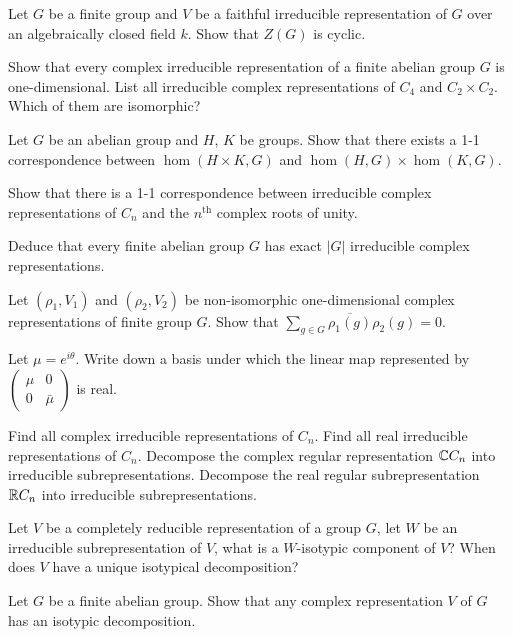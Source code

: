 \begin{question}{15}
	Let $G$ be a finite group and $V$ be a faithful irreducible representation of $G$ over an algebraically closed field $k$. Show that $Z(G)$ is cyclic.
	
	Show that every complex irreducible representation of a finite abelian group $G$ is one-dimensional. List all irreducible complex representations of $C_4$ and $C_2 \times C_2$. Which of them are isomorphic?
\end{question}

\begin{question}{16}
	Let $G$ be an abelian group and $H$, $K$ be groups. Show that there exists a 1-1 correspondence between $\hom(H\times K, G)$ and $\hom(H,G)\times \hom(K,G)$. 
	
	Show that there is a 1-1 correspondence between irreducible complex representations of $C_n$ and the $n^\text{th}$ complex roots of unity.
	
	Deduce that every finite abelian group $G$ has exact $|G|$ irreducible complex representations.
\end{question}

\begin{question}{17}
	Let $(\rho_1,V_1)$ and $(\rho_2,V_2)$ be non-isomorphic one-dimensional complex representations of finite group $G$. Show that $\sum_{g\in G} \overline{\rho_1(g)} \rho_2(g) = 0$.
\end{question}

\begin{question}{18}
	Let $\mu = e^{i\theta}$. Write down a basis under which the linear map represented by $ \begin{pmatrix}
	\mu & 0 \\ 0 & \bar{\mu}
\end{pmatrix}	$ is real.
	
	Find all complex irreducible representations of $C_n$. Find all real irreducible representations of $C_n$. Decompose the complex regular representation $\mathbb{C} C_n$ into irreducible subrepresentations. Decompose the real regular subrepresentation $\mathbb{R} C_n$ into irreducible subrepresentations.
\end{question}

\begin{question}{19}
	Let $V$ be a completely reducible representation of a group $G$, let $W$ be an irreducible subrepresentation of $V$, what is a $W$-isotypic component of $V$? When does $V$ have a unique isotypical decomposition?
	
	Let $G$ be a finite abelian group. Show that any complex representation $V$ of $G$ has an isotypic decomposition.
\end{question}

